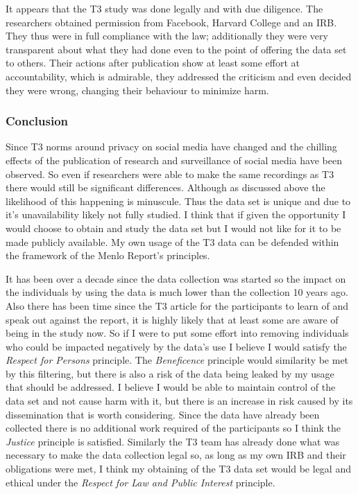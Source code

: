 \documentclass[10pt,a4paper,twocolumn]{article}
\begin{document}
It appears that the T3 study was done legally and with due diligence. The researchers obtained permission from Facebook,  Harvard College and an IRB\cite{t3}. They thus were in full compliance with the law; additionally they were very transparent about what they had done even to the point of offering the data set to others. Their actions after publication show at least some effort at accountability, which is admirable, they addressed the criticism\cite{zimmerblogcomment} and even decided they were wrong, changing their behaviour to minimize harm.

\subsubsection*{Conclusion}

Since T3 norms around privacy on social media have changed and the chilling effects of the publication of research and surveillance of social media\cite{chillingeffects} have been observed. So even if researchers were able to make the same recordings as T3 there would still be significant differences. Although as discussed above the likelihood of this happening is minuscule. Thus the data set is unique and due to it's unavailability\cite{t3site} likely not fully studied. I think that if given the opportunity I would choose to obtain and study the data set but I would not like for it to be made publicly available. My own usage of the T3 data can be defended within the framework of the Menlo Report's principles. 

It has been over a decade since the data collection was started so the impact on the individuals by using the data is much lower than the collection 10 years ago. Also there has been time since the T3 article for the participants to learn of and speak out against the report, it is highly likely that at least some are aware of being in the study now. So if I were to put some effort into removing individuals who could be impacted negatively by the data's use I believe I would satisfy the \textit{Respect for Persons} principle. The \textit{Beneficence} principle would similarity be met by this filtering, but there is also a risk of the data being leaked by my usage that should be addressed. I believe I would be able to maintain control of the data set and not cause harm with it, but there is an increase in risk caused by its dissemination that is worth considering. Since the data have already been collected there is no additional work required of the participants so I think the \textit{Justice} principle is satisfied. Similarly the T3 team has already done what was necessary to make the data collection legal so, as long as my own IRB and their obligations were met, I think my obtaining of the T3 data set would be legal and ethical under the \textit{Respect for Law and Public Interest} principle. 

{}

\end{document}
